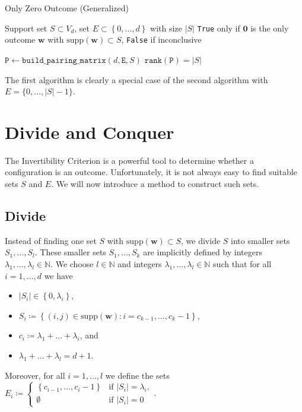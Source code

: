\begin{algorithm}[H]
\caption{Only Zero Outcome (Generalized)}\label{alg:hyperfield_criterion:is_zero_general}
    \begin{algorithmic}[1]
    \Require Support set $S \subset {V_d}$, set \( E \subset \left\{ 0, \dots, d \right\} \) with size \( \lvert S \vert \)
    \Ensure \texttt{True} only if \( \mathbf{0} \) is the only outcome \( \mathbf{w} \) with \( \mathrm{supp}(\mathbf{w}) \subset S \), \texttt{False} if inconclusive

    \State $\texttt{P} \gets \texttt{build\_pairing\_matrix}(d, \texttt{E}, S)$    
    \State \Return $\texttt{rank}(\texttt{P}) = |S|$
    \end{algorithmic}  
\end{algorithm}
The first algorithm is clearly a special case of the second algorithm with \( E =  \{0, \dots, |{S}| - 1\}\).

\section{Divide and Conquer}\label{sec:divide-and-conquer}

The Invertibility Criterion is a powerful tool to determine whether a configuration is an outcome. Unfortunately, it is not always easy to find suitable sets \( S \) and \( E \). We will now introduce a method to construct such sets.

\subsection*{Divide}\label{subsec:divide}

Instead of finding one set \( S \) with \( \mathrm{supp}(\mathbf w) \subset S \), we divide \( S \) into smaller sets \( S_1, \dots, S_l \). These smaller sets \( S_1, \dots, S_k \) are implicitly defined by integers \( \lambda_1, \dots, \lambda_l \in \mathbb{N} \). We choose \( l \in \mathbb{N} \) and integers \( \lambda_1, \dots, \lambda_l \in \mathbb{N} \) such that for all \( i=1, \dots, d \) we have 
\begin{itemize}
    \item \( \lvert S_i \rvert \in \left\{ 0, \lambda_i \right\} \), 
    \item \( S_i \coloneqq \left\{ (i,j) \in \mathrm{supp}(\mathbf w) : i = c_{k-1}, \dots, c_k - 1 \right\} \),
    \item  \( c_i \coloneqq \lambda_1 + \dots + \lambda_i\), and
    \item \(  \lambda_1 + \dots + \lambda_l = d+1 \).
\end{itemize}
Moreover, for all \( i=1, \dots, l \) we define the sets \( E_i \coloneqq \begin{cases}
    \left\{ c_{i-1}, \dots, c_i - 1 \right\} & \text{if } \lvert S_i \rvert = \lambda_i, \\
    \emptyset & \text{if } \lvert S_i \rvert = 0
\end{cases} \).

